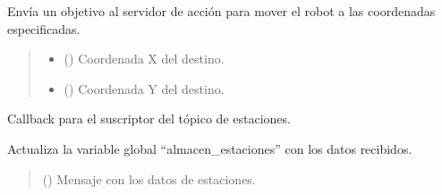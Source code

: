 \documentclass[a4paper,10pt,spanish]{sphinxmanual}
\begin{document}
\begin{fulllineitems}
\begin{fulllineitems}
\label{\detokenize{squad_state_manager:squad_state_manager.EstadoNavegacion.moveTo}}
\pysigstartsignatures
{}
\pysigstopsignatures
\sphinxAtStartPar
Envía un objetivo al servidor de acción  para mover el robot a las coordenadas especificadas.
\begin{quote}\begin{description}
\begin{itemize}
\item {} 
\sphinxAtStartPar
{} () \textendash{} Coordenada X del destino.

\item {} 
\sphinxAtStartPar
{} () \textendash{} Coordenada Y del destino.

\end{itemize}

\end{description}\end{quote}

\end{fulllineitems}


\begin{fulllineitems}
\label{\detokenize{squad_state_manager:squad_state_manager.EstadoNavegacion.stations_callback}}
\pysigstartsignatures
{}
\pysigstopsignatures
\sphinxAtStartPar
Callback para el suscriptor del tópico de estaciones.

\sphinxAtStartPar
Actualiza la variable global “almacen\_estaciones” con los datos recibidos.
\begin{quote}\begin{description}
\sphinxAtStartPar
{} () \textendash{} Mensaje con los datos de estaciones.

\end{description}\end{quote}

\end{fulllineitems}


\end{fulllineitems}
\end{document}
